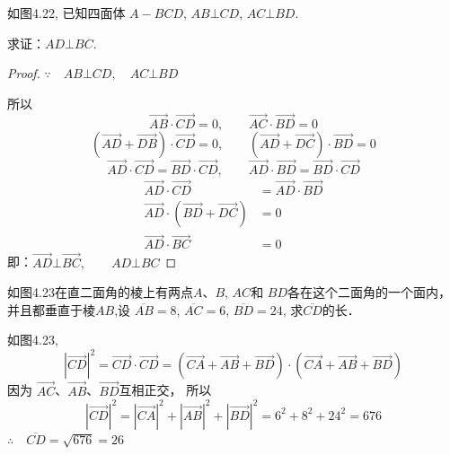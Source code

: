 \begin{example}
    如图4.22, 已知四面体
$A-BCD$, $AB\bot CD$, $AC\bot BD$.

求证：$AD\bot BC$.
\end{example}

\begin{proof}
    $\because\quad AB\bot CD,\quad AC\bot BD$

    所以
\[    \Vec{AB}\cdot \Vec{CD}=0,\qquad    \Vec{AC}\cdot \Vec{BD}=0\]
\[\left(\Vec{AD}+\Vec{DB}\right)\cdot \Vec{CD}=0,\qquad    \left(\Vec{AD}+\Vec{DC}\right)\cdot \Vec{BD}=0\]
\[\Vec{AD}\cdot \Vec{CD}=\Vec{BD}\cdot \Vec{CD},\qquad \Vec{AD}\cdot \Vec{BD}=\Vec{BD}\cdot \Vec{CD}\]
\[\begin{split}
    \Vec{AD}\cdot \Vec{CD}&=\Vec{AD}\cdot \Vec{BD}
    \\
    \Vec{AD}\cdot \left(\Vec{BD}+\Vec{DC}\right)&=0\\
    \Vec{AD}\cdot \Vec{BC}&=0
\end{split}\]
即：$\Vec{AD}\bot \Vec{BC},\qquad AD\bot BC$
\end{proof}


\begin{example}
    如图4.23在直二面角的棱上有两点$A$、$B$, $AC$和
    $BD$各在这个二面角的一个面内，并且都垂直于棱$AB$,设
    $\overline{AB}=8$, $\overline{AC}=6$, $\overline{BD}=24$, 求$\overline{CD}$的长．
\end{example}

\begin{solution}    
 如图4.23, 
\[|\Vec{CD}|^2=\Vec{CD}\cdot \Vec{CD}=\left(\Vec{CA}+\Vec{AB}+\Vec{BD}\right)\cdot \left(\Vec{CA}+\Vec{AB}+\Vec{BD}\right)\]
因为
$\Vec{AC}$、$\Vec{AB}$、$\Vec{BD}$互相正交，
所以
\[|\Vec{CD}|^2=|\Vec{CA}|^2+|\Vec{AB}|^2+|\Vec{BD}|^2=6^2+8^2+24^2=676\]
$\therefore\quad \overline{CD}=\sqrt{676}=26$
\end{solution}

